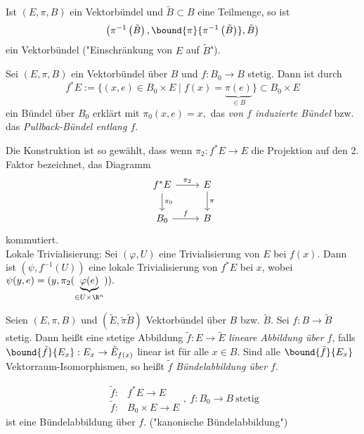 \begin{defn}[Einschränkungen]
	Ist $ (E,\pi,B) $ ein Vektorbündel und $\tilde{B} \subset B$ eine Teilmenge, so ist
	\[ \left( \pi^{-1} \left( \tilde{B} \right), \bound{\pi}{\pi^{-1} \left( \tilde{B} \right)}, \tilde{B} \right) \]
	ein Vektorbündel ("Einschränkung von $E$ auf $\tilde{B}$").
\end{defn}

\begin{defn}
	Sei $ (E ,\pi,B) $ ein Vektorbündel über $B$ und $f: B_0 \to B$ stetig. Dann ist durch
	\[ f^*E := \{(x,e) \in B_0 \times E \mid f(x) = \underbrace{\pi(e)}_{\in B}\} \subset B_0 \times E \]
	ein Bündel über $B_0$ erklärt mit $ \pi_0(x,e) = x, $ das \emph{von $f$ induzierte Bündel} bzw. das \emph{Pullback-Bündel entlang $f$}.
\end{defn}

\begin{rem}
	Die Konstruktion ist so gewählt, dass wenn $\pi_2: f^*E \to E$ die Projektion auf den 2. Faktor bezeichnet, das Diagramm
	\[ \begin{tikzcd}
		f^*E \arrow{r}{\pi_2} \arrow{d}{\pi_0} & E \arrow{d}{\pi}\\
		B_0 \arrow{r}{f} & B
	\end{tikzcd} \]
	kommutiert.\\
	Lokale Trivialisierung: Sei $ (\varphi,U) $ eine Trivialisierung von $E$ bei $f(x)$. Dann ist $ (\psi,f^{-1}(U)) $ eine lokale Trivialisierung von $f^*E$ bei $x$, wobei $ \psi(y,e) = (y,\pi_2(\underbrace{\varphi(e)}_{\in U \times \R^n})). $
\end{rem}

\begin{defn}
	Seien $ (E,\pi,B) $ und $ (\tilde{E},\tilde{\pi}\tilde{B}) $ Vektorbündel über $B$ bzw. $\tilde{B}$. Sei $f: B \to \tilde{B}$ stetig. Dann heißt eine stetige Abbildung $\tilde{f}: E \to \tilde{E}$ \emph{lineare Abbildung über $f$}, falls $ \bound{\tilde{f}}{E_x}: E_x \to \tilde{E}_{f(x)} $ linear ist für alle $x \in B$. Sind alle $ \bound{\tilde{f}}{E_x} $ Vektorraum-Isomorphismen, so heißt $\tilde{f}$ \emph{Bündelabbildung über $f$}.
\end{defn}
	
\begin{exmp*}
	\[ \begin{aligned}
		\tilde{f}:& f^*E \to E\\
		\tilde{f}:& B_0 \times E \to E
	\end{aligned},\ f:B_0 \to B \ \text{stetig} \]
	ist eine Bündelabbildung über $f$. ("kanonische Bündelabbildung")
\end{exmp*}

